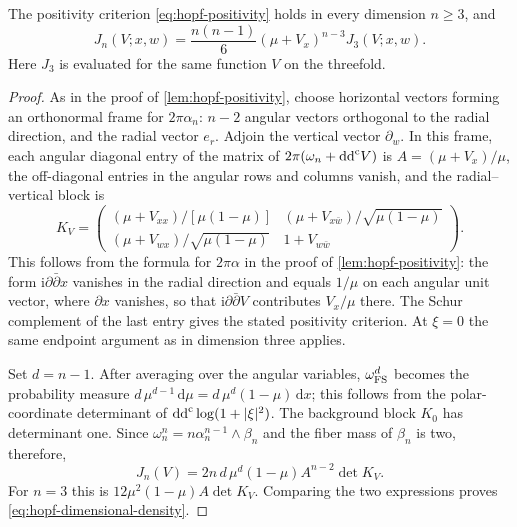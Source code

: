 \begin{lemma}\label{lem:hopf-dimensional-density}
The positivity criterion \eqref{eq:hopf-positivity} holds in every dimension $n\geq3$, and
\begin{equation}\label{eq:hopf-dimensional-density}
 J_n(V;x,w)=\frac{n(n-1)}6
                  (\mu+V_x)^{n-3}J_3(V;x,w).
\end{equation}
Here $J_3$ is evaluated for the same function $V$ on the threefold.
\end{lemma}
\begin{proof}
As in the proof of \cref{lem:hopf-positivity}, choose horizontal vectors forming an orthonormal frame for $2\pi\alpha_n$: $n-2$ angular vectors orthogonal to the radial direction, and the radial vector $e_r$. Adjoin the vertical vector $\partial_w$. In this frame, each angular diagonal entry of the matrix of $2\pi(\omega_n+\mathrm{dd}^{\mathrm{c}} V)$ is $A=(\mu+V_x)/\mu$, the off-diagonal entries in the angular rows and columns vanish, and the radial--vertical block is
\[
 K_V=\begin{pmatrix}
 (\mu+V_{xx})/[\mu(1-\mu)]&
       (\mu+V_{x\bar w})/\sqrt{\mu(1-\mu)}\\
 (\mu+V_{wx})/\sqrt{\mu(1-\mu)}&1+V_{w\bar w}
 \end{pmatrix}.
\]
This follows from the formula for $2\pi\alpha$ in the proof of \cref{lem:hopf-positivity}: the form $\mathrm i\partial\bar\partial x$ vanishes in the radial direction and equals $1/\mu$ on each angular unit vector, where $\partial x$ vanishes, so that $\mathrm i\partial\bar\partial V$ contributes $V_x/\mu$ there. The Schur complement of the last entry gives the stated positivity criterion. At $\xi=0$ the same endpoint argument as in dimension three applies.

Set $d=n-1$. After averaging over the angular variables, $\omega_{\mathrm{FS}}^{d}$ becomes the probability measure
$d\,\mu^{d-1}\,\mathrm d\mu=d\,\mu^d(1-\mu)\,\mathrm dx$;
this follows from the polar-coordinate determinant of
$\mathrm{dd}^{\mathrm{c}}\log(1+|\xi|^2)$. The background block $K_0$ has determinant one. Since $\omega_n^n=n\alpha_n^{n-1}\wedge\beta_n$ and the fiber mass of $\beta_n$ is two, therefore,
\[
 J_n(V)=2n\,d\,\mu^d(1-\mu)A^{n-2}\det K_V.
\]
For $n=3$ this is $12\mu^2(1-\mu)A\det K_V$.
Comparing the two expressions proves \eqref{eq:hopf-dimensional-density}.
\end{proof}

